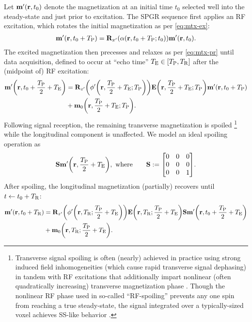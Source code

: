 Let $\bmmp\prtz$ denote the magnetization
at an initial time $t_0$ 
selected well into the steady-state
and just prior to excitation.
The SPGR sequence first applies
an RF excitation, 
which rotates the initial magnetization
as per \eqref{eq:mtx-ex}:
\begin{align}
	\bmmp\paren{\bmr,t_0+\TP} = \bmRxp{\flip\prtzt{t_0+\TP}} \bmmp\prtz.
	\label{eq:spgr-ex}
\end{align}
The excited magnetization 
then precesses and relaxes
as per \eqref{eq:mtx-pr}
until data acquisition,
defined to occur at
``echo time'' $\TE \in \brac{\TP,\TR}$
after the (midpoint of) RF excitation:
\begin{align}
	\bmmp\paren{\bmr,t_0+\frac{\TP}{2}+\TE} &=
	\bmRzp{\php\paren{\bmr,\frac{\TP}{2}+\TE;\TP}} 
	\bmE\paren{\bmr,\frac{\TP}{2}+\TE;\TP} \bmmp\paren{\bmr,t_0+\TP} \nonumber \\
	&+ \bmmzero\paren{\bmr,\frac{\TP}{2}+\TE;\TP}.
	\label{eq:spgr-daq}
\end{align}
Following signal reception,
the remaining transverse magnetization 
is spoiled 
\footnote{Transverse signal spoiling 
is often (nearly) achieved in practice
using strong induced field inhomogeneities 
(which cause rapid transverse signal dephasing)
in tandem with RF excitations
that additionally impart nonlinear
(often quadratically increasing)
transverse magnetization phase
\cite{zur:91:sot}.
Though the nonlinear RF phase
used in so-called ``RF-spoiling'' 
prevents any one spin
from reaching a true steady-state,
the signal integrated
over a typically-sized voxel
achieves SS-like behavior
\cite{denolin:05:nii}.
}
while the longitudinal component
is unaffected. 
We model an ideal spoiling operation as
\begin{align}
	\bmS \bmmp\paren{\bmr,\frac{\TP}{2}+\TE}, \where \qquad
	\bmS := 
	\begin{bmatrix}
		0 & 0 & 0 \\
		0 & 0 & 0 \\
		0 & 0 & 1
	\end{bmatrix}.
	\label{eq:spgr-spoil}
\end{align}
After spoiling, 
the longitudinal magnetization 
(partially) recovers
until $t \gets t_0+T_\mathrm{R}$:
\begin{align}
	\bmmp\paren{\bmr,t_0+\TR} &= 
	\bmRzp{\php\paren{\bmr,\TR;\frac{\TP}{2}+\TE}} 
	\bmE\paren{\bmr,\TR;\frac{\TP}{2}+\TE} \bmS 
	\bmmp\paren{\bmr,t_0+\frac{\TP}{2}+\TE} \nonumber \\
	&+ \bmmzero\paren{\bmr,\TR;\frac{\TP}{2}+\TE}.
	\label{eq:spgr-pr}
\end{align}
